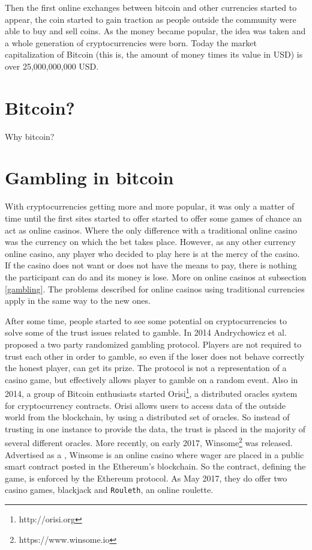 Then the first online exchanges between bitcoin and other currencies started
  to appear, the coin started to gain traction as people outside the community
  were able to buy and sell coins. As the money became popular, the idea was
  taken and a whole generation of cryptocurrencies were born. Today the
  market capitalization of Bitcoin (this is, the amount of money times its
  value in USD) is over 25,000,000,000 USD.

\section{Bitcoin?}

Why bitcoin?

\section{Gambling in bitcoin}

With cryptocurrencies getting more and more popular, it was only a matter of
  time until the first sites started to offer started to offer some games of
  chance an act as online casinos. Where the only difference with a traditional
  online casino was the currency on which the bet takes place.
However, as any other currency online casino, any player who decided to play
  here is at the mercy of the casino. If the casino does not want or does not
  have the means to pay, there is nothing the participant can do and its money
  is lose. More on online casinos at subsection \ref{gambling}. The problems
  described for online casinos using traditional currencies apply in the same
  way to the new ones.

After some time, people started to see some potential on cryptocurrencies to
  solve some of the trust issues related to gamble. In 2014 Andrychowicz et
  al. proposed a two party randomized gambling
  protocol. Players are not required to trust each other in order to gamble, so
  even if the loser does not behave correctly the honest player, can get its
  prize.
The protocol is not a representation of a casino game, but effectively allows
  player to gamble on a random event.
Also in 2014, a group of Bitcoin enthusiasts started
  Orisi\footnote{http://orisi.org},  a distributed oracles system for
  cryptocurrency contracts.
Orisi allows users to access data of the outside world from the blockchain,
  by using a distributed set of oracles. So instead of trusting in one instance
  to provide the data, the trust is placed in the majority of several different
  oracles.
More recently, on early 2017, Winsome\footnote{https://www.winsome.io} was
  released. Advertised as a , Winsome
  is an online casino where wager are placed in a public smart contract posted
  in the Ethereum's blockchain. So the contract, defining the game, is enforced
  by the Ethereum protocol. As May 2017, they do offer two casino games,
  blackjack and \texttt{Rouleth}, an online roulette.

